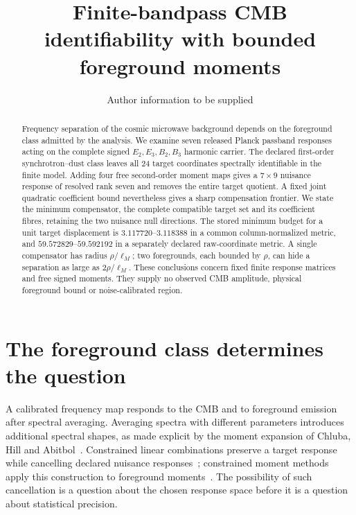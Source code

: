\documentclass[aps,prd,onecolumn,11pt,nofootinbib,notitlepage]{revtex4-2}
\begin{document}
\title{Finite-bandpass CMB identifiability with bounded foreground moments}
\author{Author information to be supplied}
\noaffiliation
\begin{abstract}
Frequency separation of the cosmic microwave background depends on the foreground class admitted by the analysis. We examine seven released Planck passband responses acting on the complete signed $E_2,E_3,B_2,B_3$ harmonic carrier. The declared first-order synchrotron--dust class leaves all 24 target coordinates spectrally identifiable in the finite model. Adding four free second-order moment maps gives a $7\times9$ nuisance response of resolved rank seven and removes the entire target quotient. A fixed joint quadratic coefficient bound nevertheless gives a sharp compensation frontier. We state the minimum compensator, the complete compatible target set and its coefficient fibres, retaining the two nuisance null directions. The stored minimum budget for a unit target displacement is $3.117720$--$3.118388$ in a common column-normalized metric, and $59.572829$--$59.592192$ in a separately declared raw-coordinate metric. A single compensator has radius $\rho/\ell_M$; two foregrounds, each bounded by $\rho$, can hide a separation as large as $2\rho/\ell_M$. These conclusions concern fixed finite response matrices and free signed moments. They supply no observed CMB amplitude, physical foreground bound or noise-calibrated region.
\end{abstract}
\maketitle

\section{The foreground class determines the question}

A calibrated frequency map responds to the CMB and to foreground emission after spectral averaging. Averaging spectra with different parameters introduces additional spectral shapes, as made explicit by the moment expansion of Chluba, Hill and Abitbol~\cite{Chluba2017}. Constrained linear combinations preserve a target response while cancelling declared nuisance responses~\cite{Remazeilles2011}; constrained moment methods apply this construction to foreground moments~\cite{Remazeilles2021}. The possibility of such cancellation is a question about the chosen response space before it is a question about statistical precision.
\end{document}

